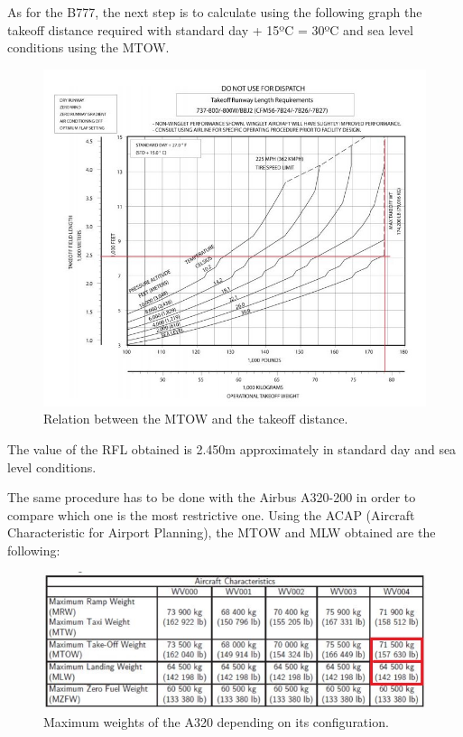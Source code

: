 		As for the B777, the next step is to calculate using the following graph the takeoff distance required with standard day + 15ºC = 30ºC and sea level conditions using the MTOW.
		
		\begin{figure}[H]
			\centering
			\includegraphics[clip, trim=0cm 0cm 0cm 0cm, width=1\textwidth]{./images/B737/takeoff-weight737}
			\caption{Relation between the MTOW and the takeoff distance.} %
			\label{} %
		\end{figure}
	
		The value of the RFL obtained is 2.450m approximately in standard day and sea level conditions. 
		
		The same procedure has to be done with the Airbus A320-200 in order to compare which one is the most restrictive one. Using the ACAP (Aircraft Characteristic for Airport Planning), the MTOW and MLW obtained are the following:
		
		\begin{figure}[H]
			\centering
			\includegraphics[clip, trim=0cm 0cm 0cm 0cm, width=1\textwidth]{./images/A320/A320MTOW}
			\caption{Maximum weights of the A320 depending on its configuration.} %
			\label{} %
		\end{figure}
	

